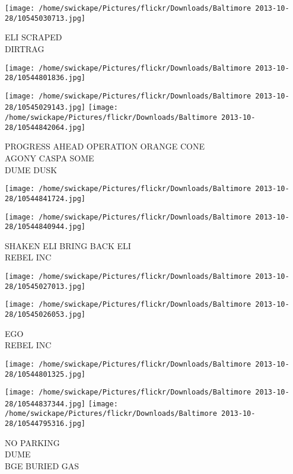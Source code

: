 \documentclass[10pt,letterpaper]{article}
\begin{document}
\vspace{0.25in}
\texttt{[image: /home/swickape/Pictures/flickr/Downloads/Baltimore 2013-10-28/10545030713.jpg]}

ELI SCRAPED\\
DIRTRAG
\pagebreak

\texttt{[image: /home/swickape/Pictures/flickr/Downloads/Baltimore 2013-10-28/10544801836.jpg]}

\vspace{0.25in}
\texttt{[image: /home/swickape/Pictures/flickr/Downloads/Baltimore 2013-10-28/10545029143.jpg]}
\texttt{[image: /home/swickape/Pictures/flickr/Downloads/Baltimore 2013-10-28/10544842064.jpg]}

PROGRESS AHEAD OPERATION ORANGE CONE\\
AGONY CASPA SOME\\
DUME DUSK
\pagebreak

\texttt{[image: /home/swickape/Pictures/flickr/Downloads/Baltimore 2013-10-28/10544841724.jpg]}

\vspace{0.25in}
\texttt{[image: /home/swickape/Pictures/flickr/Downloads/Baltimore 2013-10-28/10544840944.jpg]}

SHAKEN ELI BRING BACK ELI\\
REBEL INC
\pagebreak

\texttt{[image: /home/swickape/Pictures/flickr/Downloads/Baltimore 2013-10-28/10545027013.jpg]}

\vspace{0.25in}
\texttt{[image: /home/swickape/Pictures/flickr/Downloads/Baltimore 2013-10-28/10545026053.jpg]}

EGO\\
REBEL INC
\pagebreak

\texttt{[image: /home/swickape/Pictures/flickr/Downloads/Baltimore 2013-10-28/10544801325.jpg]}

\vspace{0.25in}
\texttt{[image: /home/swickape/Pictures/flickr/Downloads/Baltimore 2013-10-28/10544837344.jpg]}
\texttt{[image: /home/swickape/Pictures/flickr/Downloads/Baltimore 2013-10-28/10544795316.jpg]}

NO PARKING\\
DUME\\
BGE BURIED GAS
\pagebreak
\end{document}
